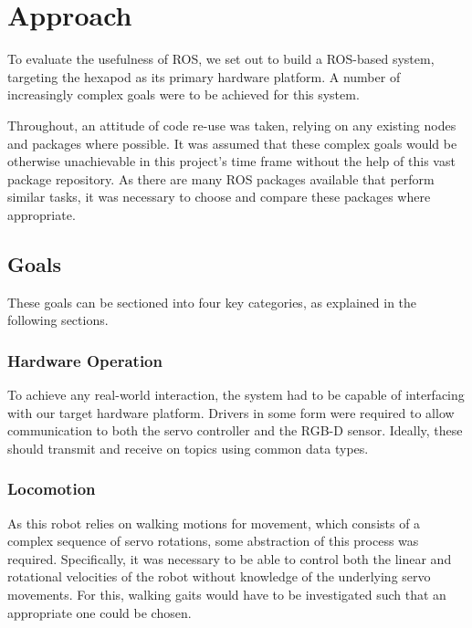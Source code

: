 \chapter{Approach}
\label{chap:approach}

To evaluate the usefulness of ROS, we set out to build a ROS-based system, targeting the hexapod as its primary hardware platform. A number of increasingly complex goals were to be achieved for this system.

Throughout, an attitude of code re-use was taken, relying on any existing nodes and packages where possible. It was assumed that these complex goals would be otherwise unachievable in this project's time frame without the help of this vast package repository. As there are many ROS packages available that perform similar tasks, it was necessary to choose and compare these packages where appropriate. 


\section{Goals}

These goals can be sectioned into four key categories, as explained in the following sections.

\subsection{Hardware Operation}

To achieve any real-world interaction, the system had to be capable of interfacing with our target hardware platform. Drivers in some form were required to allow communication to both the servo controller and the RGB-D sensor. Ideally, these should transmit and receive on topics using common data types.

\subsection{Locomotion}

As this robot relies on walking motions for movement, which consists of a complex sequence of servo rotations, some abstraction of this process was required. Specifically, it was necessary to be able to control both the linear and rotational velocities of the robot without knowledge of the underlying servo movements. For this, walking gaits would have to be investigated such that an appropriate one could be chosen.

